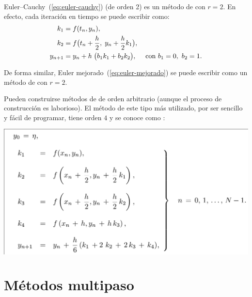 \begin{example}
  Euler--Cauchy~(\ref{eq:euler-cauchy}) (de orden 2) es un método de \RK
  con $r=2$. En efecto, cada iteración en tiempo se puede escribir
  como:
  \begin{align*}
    k_1 &= f({t_n},{y_n}), \\ k_2 &= f\big(t_{n}+\frac{h}{2},\; {y_n}+\frac{h}{2}k_1 \big),
    \\
    {y_{n+1}} &= {y_n} + h \; \big( b_1k_1 + b_2 k_2 \big),
    \quad
    \text{ con } b_1=0,\ b_2=1.
  \end{align*}

  De forma similar, Euler mejorado~(\ref{eq:euler-mejorado}) se puede escribir como un método de
  \RK con $r=2$.
\end{example}

\begin{example}
  Pueden construirse métodos de \RK de orden arbitrario
  (aunque el proceso de construcción es laborioso). El método de este
  tipo más utilizado, por ser sencillo y fácil de programar, tiene
  orden $4$ y se conoce como :
  \begin{center}
    \includegraphics[width=0.9\linewidth]{tema4/R-K-clasico}
  \end{center}
\end{example}

\section{Métodos multipaso}
\label{sec:metodos-multipaso}

